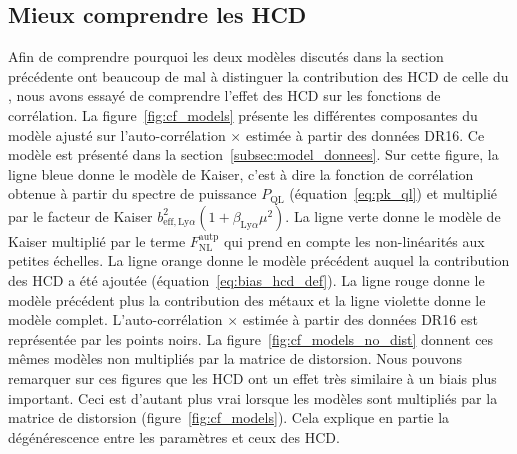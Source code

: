 \documentclass[11pt, twoside, a4paper, openright]{report}
\begin{document}
\subsection{Mieux comprendre les HCD}


Afin de comprendre pourquoi les deux modèles discutés dans la section précédente ont beaucoup de mal à distinguer la contribution des HCD de celle du \lya{}, nous avons essayé de comprendre l'effet des HCD sur les fonctions de corrélation.
La figure~\ref{fig:cf_models} présente les différentes composantes du modèle ajusté sur l'auto-corrélation \lya{}$\times$\lya{} estimée à partir des données DR16. Ce modèle est présenté dans la section~\ref{subsec:model_donnees}.
Sur cette figure, la ligne bleue donne le modèle de Kaiser, c'est à dire la fonction de corrélation obtenue à partir du spectre de puissance $P_{\mathrm{QL}}$ (équation~\ref{eq:pk_ql}) et multiplié par le facteur de Kaiser $b_{\mathrm{eff},\mathrm{Ly}\alpha}^2 (1 + \beta_{\mathrm{Ly}\alpha} \mu^2)$. La ligne verte donne le modèle de Kaiser multiplié par le terme $F_{\mathrm{NL}}^{\mathrm{autp}}$ qui prend en compte les non-linéarités aux petites échelles. La ligne orange donne le modèle précédent auquel la contribution des HCD a été ajoutée (équation~\ref{eq:bias_hcd_def}). La ligne rouge donne le modèle précédent plus la contribution des métaux et la ligne violette donne le modèle complet. L'auto-corrélation \lya{}$\times$\lya{} estimée à partir des données DR16 est représentée par les points noirs. La figure~\ref{fig:cf_models_no_dist} donnent ces mêmes modèles non multipliés par la matrice de distorsion.
Nous pouvons remarquer sur ces figures que les HCD ont un effet très similaire à un biais plus important.
Ceci est d'autant plus vrai lorsque les modèles sont multipliés par la matrice de distorsion (figure~\ref{fig:cf_models}).
Cela explique en partie la dégénérescence entre les paramètres \lya{} et ceux des HCD.
\end{document}
